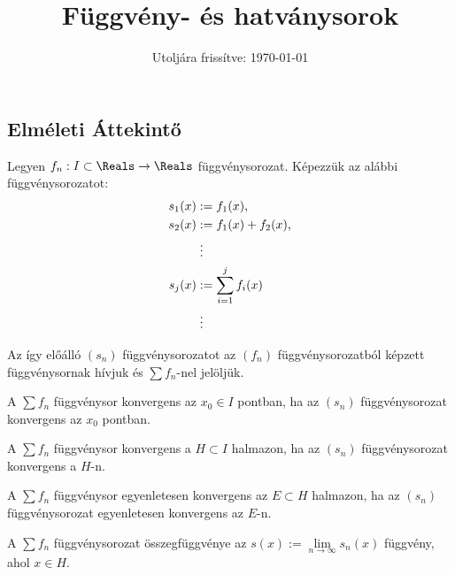 \documentclass[a4paper, 12pt]{scrartcl}
\title{Függvény- és hatványsorok}
\date{Utoljára frissítve: \today}
\begin{document}
\maketitle
\subsection{Elméleti Áttekintő}

\begin{definition}[Függvénysor]
  Legyen $f_n : I \subset \Reals \to \Reals$ függvénysorozat. Képezzük az
  alábbi függvénysorozatot:
  \begin{align*}
    s_1(x) & := f_1(x)
    \text,                              \\
    s_2(x) & := f_1(x) + f_2(x)
    \text,                              \\
           & \phantom{:} \vdots
    \\
    s_j(x) & := \sum_{i = 1}^{j} f_i(x)
    \\
           & \phantom{:} \vdots
  \end{align*}

  Az így előálló $(s_n)$ függvénysorozatot az $(f_n)$ függvénysorozatból képzett
  függvénysornak hívjuk és $\sum f_n$-nel jelöljük.
\end{definition}

\begin{definition}
  A $\sum f_n$ függvénysor konvergens az $x_0 \in I$ pontban, ha az $(s_n)$
  függvénysorozat konvergens az $x_0$ pontban.
\end{definition}

\begin{definition}
  A $\sum f_n$ függvénysor konvergens a $H \subset I$ halmazon, ha az
  $(s_n)$ függvénysorozat konvergens a $H$-n.
\end{definition}

\begin{definition}
  A $\sum f_n$ függvénysor egyenletesen konvergens az $E \subset H$
  halmazon, ha az $(s_n)$ függvénysorozat egyenletesen konvergens az $E$-n.
\end{definition}

\begin{definition}
  A $\sum f_n$ függvénysorozat összegfüggvénye az $s(x) := \lim\limits_{n \to
      \infty} s_n(x)$ függvény, ahol $x \in H$.
\end{definition}
\end{document}
